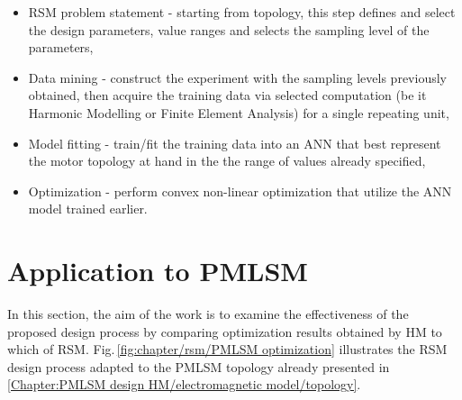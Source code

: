         
        \begin{itemize}
            \item RSM problem statement - starting from topology, this step defines and select the design parameters, value ranges and selects the sampling level of the parameters,
            \item Data mining - construct the experiment with the sampling levels previously obtained, then acquire the training data via selected computation (be it Harmonic Modelling or Finite Element Analysis) for a single repeating unit,
            \item Model fitting - train/fit the training data into an \ac{ANN} that best represent the motor topology at hand in the the range of values already specified,
            \item Optimization - perform convex non-linear optimization that utilize the \ac{ANN} model trained earlier.
        \end{itemize}
        

    \section{Application to \ac{PMLSM}}             \label{Chapter:RSM/PMLSM}
    
        
        In this section, the aim of the work is to examine the effectiveness of the proposed design process by comparing optimization results obtained by \acs{HM} to which of \acs{RSM}. Fig.\,\ref{fig:chapter/rsm/PMLSM optimization} illustrates the \acs{RSM} design process adapted to the \acs{PMLSM} topology already presented in \ref{Chapter:PMLSM design HM/electromagnetic model/topology}. 
        
